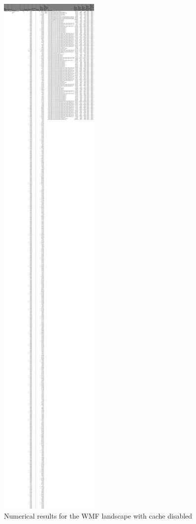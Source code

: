 \begin{figure}[!h]
	\centering
	\begin{adjustbox}{width=\textwidth,totalheight=0.9\textheight}
		\includegraphics[angle=90]{Figures/wmf_allhar.pdf}
	\end{adjustbox}
	\caption{Numerical results for the WMF landscape with cache disabled}
	\label{fig:appendix_1_26}
\end{figure}
